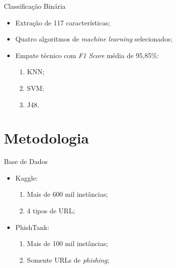 \documentclass{beamer}
\begin{document}
\begin{frame}{Classificação Binária}

    \begin{itemize}
        \setlength{\itemsep}{10pt}
        \item Extração de 117 características;
        \item Quatro algoritmos de \emph{machine learning} selecionados;
        \item Empate técnico com \emph{F1 Score} média de 95,85\%:
        \begin{enumerate}
            \vspace{0.2cm}
            \setlength{\itemsep}{10pt}
            \item KNN;
            \item SVM;
            \item J48. 
        \end{enumerate}
    \end{itemize}
    
\end{frame}

\section{Metodologia}

\begin{frame}{Base de Dados}
    
    \begin{itemize}
        \setlength{\itemsep}{10pt}
        \item Kaggle\footnotemark:
        \begin{enumerate}
            \vspace{0.2cm}
            \setlength{\itemsep}{10pt}
            \item Mais de 600 mil instâncias;
            \item 4 tipos de URL;
        \end{enumerate}
        \item PhishTank\footnotemark:
        \begin{enumerate}
            \vspace{0.2cm}
            \setlength{\itemsep}{10pt}
            \item Mais de 100 mil instâncias;
            \item Somente URLs de \emph{phishing};
        \end{enumerate}
    \end{itemize}

    
\end{frame}
\end{document}
